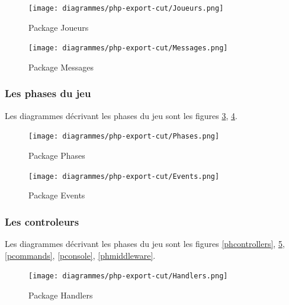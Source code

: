 			\begin{figure}[!h]
				\centering
                \texttt{[image: diagrammes/php-export-cut/Joueurs.png]}
                \caption{\label{pjoueurs}Package Joueurs}
			\end{figure}

			\begin{figure}[h!]
				\centering
                \texttt{[image: diagrammes/php-export-cut/Messages.png]}
                \caption{\label{pmessages}Package Messages}
                \pagebreak
			\end{figure} 

        \newpage
        \subsubsection{Les phases du jeu}
        Les diagrammes décrivant les phases du jeu sont les figures \ref{pphases}, \ref{pevents}.

			\begin{figure}[!h]
				\centering
                \texttt{[image: diagrammes/php-export-cut/Phases.png]}
                \caption{\label{pphases}Package Phases}
			\end{figure}

			\begin{figure}[!h]
				\centering
                \texttt{[image: diagrammes/php-export-cut/Events.png]}
                \caption{\label{pevents}Package Events}
			\end{figure}
        
        \newpage
        \subsubsection{Les controleurs}
        Les diagrammes décrivant les phases du jeu sont les figures \ref{phcontrollers}, \ref{phandlers}, \ref{pcommands}, \ref{pconsole}, \ref{phmiddleware}.
        

			\begin{figure}[!h]
				\centering
                \texttt{[image: diagrammes/php-export-cut/Handlers.png]}
                \caption{\label{phandlers}Package Handlers}
			\end{figure}

